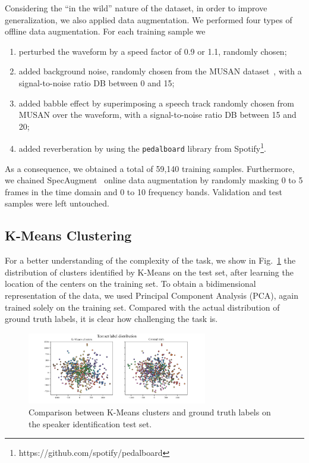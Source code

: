 \documentclass[conference]{IEEEtran}
\begin{document}
Considering the ``in the wild'' nature of the dataset, in order to improve generalization, we also applied data augmentation. We performed four types of offline data augmentation. For each training sample we
\begin{enumerate}
    \item perturbed the waveform by a speed factor of 0.9 or 1.1, randomly chosen;
    \item added background noise, randomly chosen from the MUSAN dataset~\cite{snyder2015musan}, with a signal-to-noise ratio DB between 0 and 15;
    \item added babble effect by superimposing a speech track randomly chosen from MUSAN over the waveform, with a signal-to-noise ratio DB between 15 and 20;
    \item added reverberation by using the \texttt{pedalboard} library from Spotify\footnote{https://github.com/spotify/pedalboard}.
\end{enumerate}
As a consequence, we obtained a total of 59,140 training samples. Furthermore, we chained SpecAugment~\cite{park2019specaug} online data augmentation by randomly masking 0 to 5 frames in the time domain and 0 to 10 frequency bands. Validation and test samples were left untouched.

\subsection{K-Means Clustering}

For a better understanding of the complexity of the task, we show in Fig.~\ref{fig:k_means} the distribution of clusters identified by K-Means on the test set, after learning the location of the centers on the training set. To obtain a bidimensional representation of the data, we used Principal Component Analysis (PCA), again trained solely on the training set. Compared with the actual distribution of ground truth labels, it is clear how challenging the task is.

\begin{figure}[htbp]
    \centerline{\includegraphics[width=0.7\textwidth]{img/k_means.png}}
    \caption{Comparison between K-Means clusters and ground truth labels on the speaker identification test set.}
    \label{fig:k_means}
\end{figure}
\end{document}
